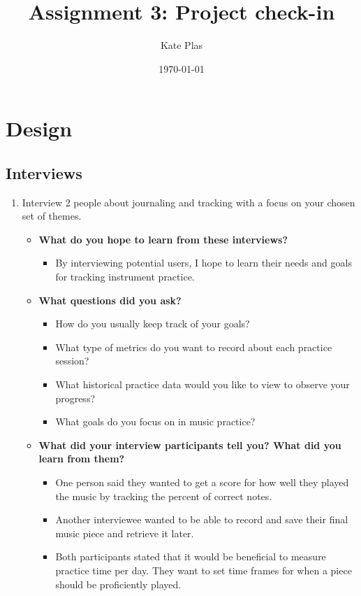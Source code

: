 \documentclass{article}
\title{Assignment 3: Project check-in}
\author{Kate Plas}
\date{\today}
\begin{document}
\maketitle

\section{Design}

\subsection{Interviews}
\begin{enumerate}
    \item Interview 2 people about journaling and tracking with a focus on your chosen set of themes.
    \begin{itemize}
        \item \textbf{What do you hope to learn from these interviews?}  
        \begin{itemize}
        \item By interviewing potential users, I hope to learn their needs and goals for tracking instrument practice.
        \end{itemize}
        \item \textbf{What questions did you ask?}
        \begin{itemize}
            \item How do you usually keep track of your goals?
            \item What type of metrics do you want to record about each practice session?
            \item What historical practice data would you like to view to observe your progress?
            \item What goals do you focus on in music practice?
        \end{itemize}
        \item \textbf{What did your interview participants tell you? What did you learn from them?}
        \begin{itemize}
            \item One person said they wanted to get a score for how well they played the music by tracking the percent of correct notes.
            \item Another interviewee wanted to be able to record and save their final music piece and retrieve it later.
            \item Both participants stated that it would be beneficial to measure practice time per day. They want to set time frames for when a piece should be proficiently played.
        \end{itemize}
    \end{itemize}
\end{enumerate}
\end{document}
